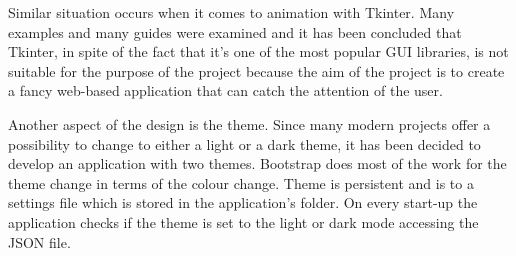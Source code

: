 \documentclass[12pt]{report}
\begin{document}
\clearpage

Similar situation occurs when it comes to animation with Tkinter. Many examples and many guides were examined and 
it has been concluded that Tkinter, in spite of the fact that it's one of the most popular GUI libraries, is not
suitable for the purpose of the project because the aim of the project is to create a fancy web-based application
that can catch the attention of the user.

Another aspect of the design is the theme. Since many modern projects offer a possibility to change to 
either a light or a dark theme, it has been decided to develop an application with two themes. Bootstrap 
does most of the work for the theme change in terms of the colour change. Theme is persistent and is to a
settings file which is stored in the application's folder. On every start-up the application checks if the
theme is set to the light or dark mode accessing the JSON file.
\end{document}
